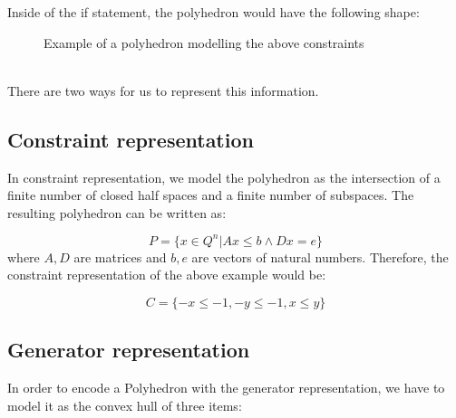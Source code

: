 Inside of the if statement, the polyhedron would have the following shape:

\begin{figure}[h]
\begin{center}
	\caption{Example of a polyhedron modelling the above constraints}

\end{center}
\end{figure}
\mbox{}\\

There are two ways for us to represent this information.
\subsection{Constraint representation}
In constraint representation, we model the polyhedron as the intersection of a finite number of closed half spaces and a finite number of subspaces. The resulting polyhedron can be written as:

\begin{equation}
    P=\{x\in Q^n |Ax\leq b \wedge Dx=e\}
\end{equation}
where $A,D$ are matrices and $b,e$ are vectors of natural numbers. Therefore, the constraint representation of the above example would be:

\begin{equation}
    C = \{-x \leq -1, -y \leq -1, x\leq y \} 
\end{equation}

\subsection{Generator representation}
In order to encode a Polyhedron with the generator representation, we have to model it as the convex hull of three items: 

